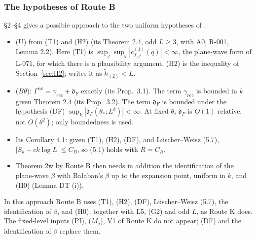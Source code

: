 \subsubsection{The hypotheses of Route B}\label{sec:routeBinputs}

\begin{remark}
 \S2--\S4 gives a possible approach to the two uniform hypotheses of \ThmPW{}.
\begin{itemize}
\item (U) from (T1) and (H2) (its Theorem 2.4, odd $L\ge3$, with A0, R-001, Lemma 2.2). Here (T1) is $\sup_j\sup_q|c^{(1)}_{T,j}(q)|<\infty$, the plane-wave form of L-071, for which there is a plausibility argument. (H2) is the inequality of Section~\ref{sec:H2};  writes it as $\tilde h_{(2)}<L$.
\item ($B\theta$): $\Gamma^{ex}=\gamma_{rec}+\mathfrak d_F$ exactly (its Prop.\ 3.1). The term $\gamma_{rec}$ is bounded in $k$ given Theorem 2.4 (its Prop.\ 3.2). The term $\mathfrak d_F$ is bounded under the hypothesis (DF) $\sup_k|\mathfrak d_F(\theta_*;L^k)|<\infty$. At fixed $\theta$, $\mathfrak d_F$ is $O(1)$ relative, not $O(\theta^2)$; only boundedness is used.
\item Its Corollary 4.1: given (T1), (H2), (DF), and L\"uscher--Weisz (5.7), $|S_k-ck\log L|\le C_B$, so (5.1) holds with $R=C_B$.
\item Theorem 2w by Route B then needs in addition the identification of the plane-wave $\beta$ with Ba{\l}aban's $\beta$ up to the expansion point, uniform in $k$, and (H0) (Lemma DT (i)).
\end{itemize}
In this approach Route B uses (T1), (H2), (DF), L\"uscher--Weisz (5.7), the identification of $\beta$, and (H0), together with L5, (G2) and odd $L$, as Route K does. The fixed-level inputs (PI), ($M_j$), V1 of Route K do not appear; (DF) and the identification of $\beta$ replace them.
\end{remark}

